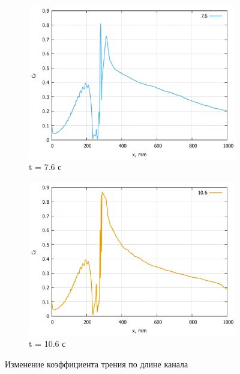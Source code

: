 \begin{figure}[H]
\begin{subfigure}{.5\textwidth}
			\includegraphics[width=1\linewidth]{../Assets/Cf-T760}
			\caption{t = 7.6 с}
			\label{fig:Cf-T760}
		\end{subfigure}%
		\begin{subfigure}{.5\textwidth}
			\centering
			\includegraphics[width=1\linewidth]{../Assets/Cf-T1060}
			\caption{t = 10.6 с}
			\label{fig:Cf-T1060}
		\end{subfigure}
		\caption{Изменение коэффициента трения по длине канала}
		\label{fig:cf}
	\end{figure}
